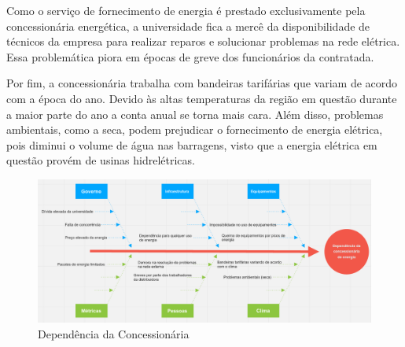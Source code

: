 \par Como o serviço de fornecimento de energia é prestado exclusivamente pela concessionária energética, a universidade fica a mercê da disponibilidade de técnicos da empresa para realizar reparos e solucionar problemas na rede elétrica. Essa problemática piora em épocas de greve dos funcionários da contratada. 
\par Por fim, a concessionária trabalha com bandeiras tarifárias que variam de acordo com a época do ano. Devido às altas temperaturas da região em questão durante a maior parte do ano a conta anual se torna mais cara. Além disso, problemas ambientais, como a seca, podem prejudicar o fornecimento de energia elétrica, pois diminui o volume de água nas barragens, visto que a energia elétrica em questão provém de usinas hidrelétricas. 
\begin{figure}[!htb]
\centering
\includegraphics[width=0.75\paperwidth]{figuras/Fishbone3.png}
\caption{Dependência da Concessionária}
\end{figure}